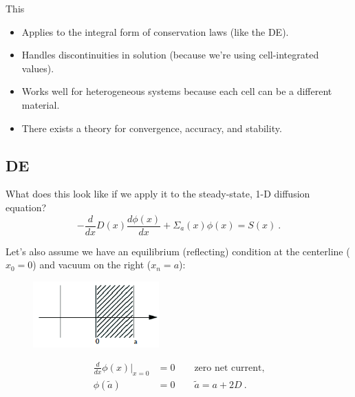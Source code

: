 \documentclass[12pt]{article}
\begin{document}
This
\begin{itemize}
\item Applies to the integral form of conservation laws (like the DE).
\item Handles discontinuities in solution (because we're using cell-integrated values).
\item Works well for heterogeneous systems because each cell can be a different material.
\item There exists a theory for convergence, accuracy, and stability.
\end{itemize}


\subsection*{DE} 
What does this look like if we apply it to the steady-state, 1-D diffusion equation?
\[-\frac{d}{dx}D(x)\frac{d \phi(x)}{dx} + \Sigma_a(x) \phi(x) = S(x)\:.
\]

Let's also assume we have an equilibrium (reflecting) condition at the centerline ($x_0 = 0$) and vacuum on the right ($x_n = a$):

\begin{figure}[h!]
\includegraphics[height=1in]{FVM-fig}
\end{figure}
%
\begin{align}
\frac{d}{dx}\phi(x) \big|_{x=0} &= 0 \qquad \text{zero net current,} \nonumber\\
\phi(\tilde{a}) &= 0 \qquad \tilde{a} = a + 2D \:.\nonumber
\end{align}
\end{document}
